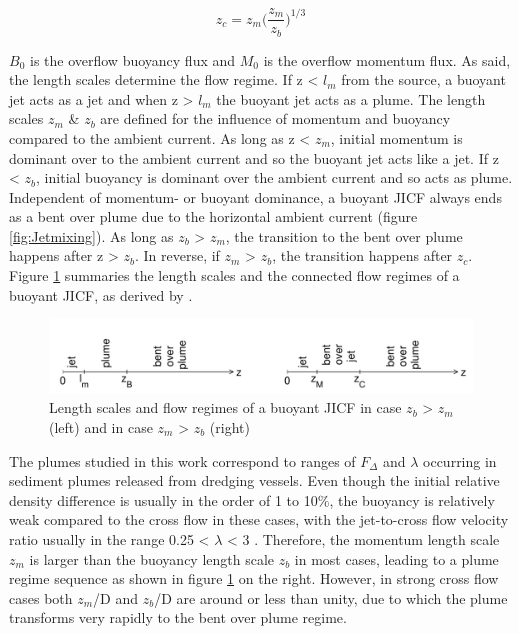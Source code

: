 \begin{equation}
\label{eq:zc}
 z_c = z_m\Big(\frac{z_m}{z_b}\Big)^{1/3} 
\end{equation}



\noindent $B_0$ is the overflow buoyancy flux and $M_0$ is the overflow momentum flux. As said, the length scales determine the flow regime. If z < $l_m$ from the source, a buoyant jet acts as a jet and when z > $l_m$ the buoyant jet acts as a plume. The length scales $z_m$ \& $z_b$ are defined for the influence of momentum and buoyancy compared to the ambient current. As long as z < $z_m$, initial momentum is dominant over to the ambient current and so the buoyant jet acts like a jet. If z < $z_b$, initial buoyancy is dominant over the ambient current and so acts as plume. \newline
Independent of momentum- or buoyant dominance, a buoyant JICF always ends as a bent over plume due to the horizontal ambient current (figure \ref{fig:Jetmixing}). As long as $z_b$ > $z_m$, the transition to the bent over plume happens after z > $z_b$. In reverse, if $z_m$ > $z_b$, the transition happens after $z_c$. Figure \ref{fig:lengthscales} \citep{Dewit} summaries the length scales and the connected flow regimes of a buoyant JICF, as derived by \cite{Fischer+}.

\begin{figure}[ht!]
    \centering
    \includegraphics[width=1\linewidth]{Images/Length_scale_z.png}
    \caption{Length scales and flow regimes of a buoyant JICF in case $z_b$ > $z_m$ (left) and in case $z_m$ > $z_b$ (right) }
    \label{fig:lengthscales}
\end{figure}

\noindent The plumes studied in this work correspond to ranges of $F_\Delta$ and $\lambda$ occurring in sediment plumes released from dredging vessels. Even though the initial relative density difference is usually in the order of 1 to 10\%, the buoyancy is relatively weak compared to the cross flow in these cases, with the jet-to-cross flow velocity ratio usually in the range 0.25 < $\lambda$ < 3 \citep{Decrop}. Therefore, the momentum length scale $z_m$ is larger than the buoyancy length scale $z_b$ in most cases, leading to a plume regime sequence as shown in figure \ref{fig:lengthscales} on the right. However, in strong cross flow cases both $z_m$/D and $z_b$/D are around or less than unity, due to which the plume transforms very rapidly to the bent over plume regime.


